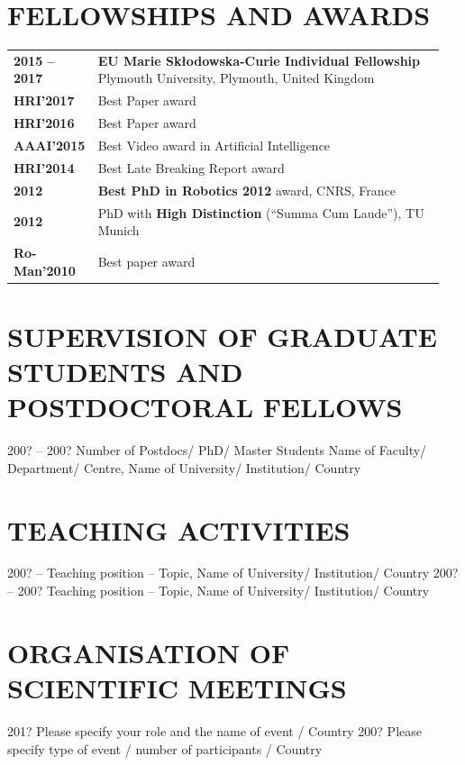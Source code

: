 \documentclass[11pt]{report}
\begin{document}
\section{FELLOWSHIPS AND AWARDS}

\begin{tabular}{p{0.15\linewidth}p{0.8\linewidth}}
    \bf 2015 -- 2017 & {\bf EU Marie Skłodowska-Curie Individual Fellowship}    \newline Plymouth University, Plymouth, United Kingdom \\
    \bf HRI'2017  & Best Paper award\\
    \bf HRI'2016  & Best Paper award\\
    \bf AAAI'2015  & Best Video award in Artificial Intelligence\\
    \bf HRI'2014  & Best Late Breaking Report award\\
    \bf 2012         & {\bf Best PhD in Robotics 2012} award, CNRS, France \\
    \bf 2012         & PhD with {\bf High Distinction} (“Summa Cum Laude”), TU Munich\\
    \bf Ro-Man'2010  & Best paper award\\
\end{tabular}


\section{SUPERVISION OF GRADUATE STUDENTS AND POSTDOCTORAL FELLOWS}

200? – 200? 	Number of Postdocs/ PhD/ Master Students
Name of Faculty/ Department/ Centre, Name of University/ Institution/ Country


\section{TEACHING ACTIVITIES}

200? – 	Teaching position – Topic, Name of University/ Institution/ Country
200? – 200? 	Teaching position – Topic, Name of University/ Institution/ Country



\section{ORGANISATION OF SCIENTIFIC MEETINGS}

201?	Please specify your role and the name of event / Country 
200? 	Please specify type of event / number of participants / Country
\end{document}
